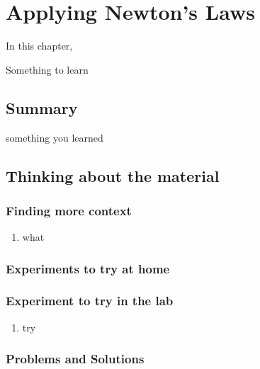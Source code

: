 
\chapter{Applying Newton's Laws}
\label{chap:ApplyingNewtonsLaws}
In this chapter,

 \vspace{1cm}
\begin{learningObjectives}
\item Something to learn
\end{learningObjectives}



\newpage
\section{Summary}
\vspace{1cm}
\begin{chapterSummary}
\item something you learned
\end{chapterSummary}


\section{Thinking about the material}

\subsection{Finding more context}
\begin{enumerate}
\item what
\end{enumerate}

\subsection{Experiments to try at home}

\subsection{Experiment to try in the lab}
\begin{enumerate}
\item try
\end{enumerate}

\subsection{Problems and Solutions}
 
